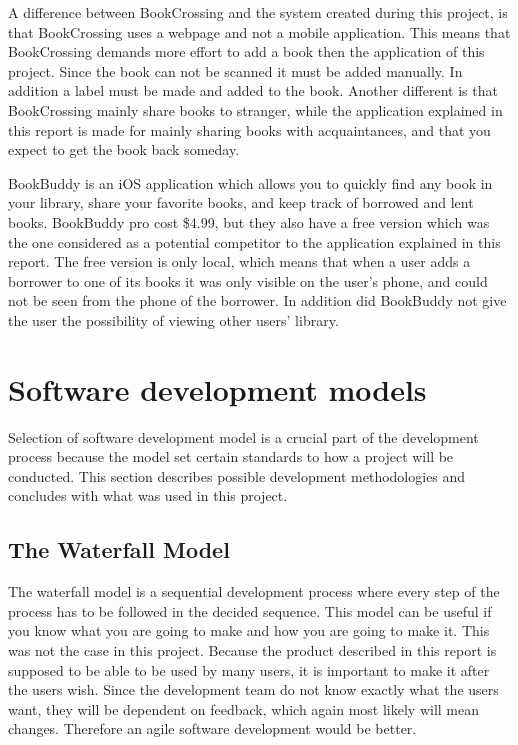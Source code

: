 A difference between BookCrossing and the system created during this project, is that BookCrossing uses a webpage and not a mobile application. This means that BookCrossing demands more effort to add a book then the application of this project. Since the book can not be scanned it must be added manually. In addition a label must be made and added to the book. Another different is that BookCrossing mainly share books to stranger, while the application explained in this report is made for mainly sharing books with acquaintances, and that you expect to get the book back someday. 

BookBuddy is an iOS application which allows you to quickly find any book in your library, share your favorite books, and keep track of borrowed and lent books.\cite{book-buddy} BookBuddy pro cost \$4.99, but they also have a free version which was the one considered as a potential competitor to the application explained in this report. The free version is only local, which means that when a user adds a borrower to one of its books it was only visible on the user's phone, and could not be seen from the phone of the borrower. In addition did BookBuddy not give the user the possibility of viewing other users' library.

\section{Software development models}
Selection of software development model is a crucial part of the development process because the model set certain standards to how a project will be conducted. This section describes possible development methodologies and concludes with what was used in this project. 

\subsection{The Waterfall Model}
The waterfall model is a sequential development process where every step of the process has to be followed in the decided sequence.\cite[p.~30-32]{software-engineering} This model can be useful if you know what you are going to make and how you are going to make it. This was not the case in this project. Because the product described in this report is supposed to be able to be used by many users, it is important to make it after the users wish. Since the development team do not know exactly what the users want, they will be dependent on feedback, which again most likely will mean changes. Therefore an agile software development would be better.

